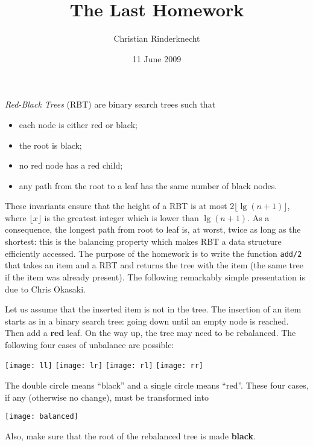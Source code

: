 \documentclass[11pt,a4paper]{article}
\title{The Last Homework}
\author{Christian Rinderknecht}
\date{11 June 2009}
\begin{document}
\maketitle

\thispagestyle{empty}

\noindent \emph{Red-Black Trees} (RBT) are binary search trees such
that
\begin{itemize}

  \item each node is either red or black;

  \item the root is black;

  \item no red node has a red child;

  \item any path from the root to a leaf has the same number of
    black nodes.

\end{itemize}
These invariants ensure that the height of a RBT is at most
\(2\lfloor{\lg(n+1)}\rfloor\), where \(\lfloor{x}\rfloor\) is the
greatest integer which is lower than \(\lg(n+1)\). As a consequence,
the longest path from root to leaf is, at worst, twice as long as the
shortest: this is the balancing property which makes RBT a data
structure efficiently accessed. The purpose of the homework is to
write the function \texttt{add/2} that takes an item and a RBT and
returns the tree with the item (the same tree if the item was already
present). The following remarkably simple presentation is due to Chris
Okasaki.

Let us assume that the inserted item is not in the tree. The insertion
of an item starts as in a binary search tree: going down until an
empty node is reached. Then add a \textbf{red} leaf. On the way up,
the tree may need to be rebalanced. The following four cases of
unbalance are possible:
\begin{center}
\texttt{[image: ll]}
\qquad
\texttt{[image: lr]}
\qquad
\texttt{[image: rl]}
\qquad
\texttt{[image: rr]}
\end{center}
The double circle means ``black'' and a single circle means ``red''.
These four cases, if any (otherwise no change), must be transformed
into
\begin{center}
\texttt{[image: balanced]}
\end{center}
Also, make sure that the root of the rebalanced tree is made
\textbf{black}.
\end{document}
